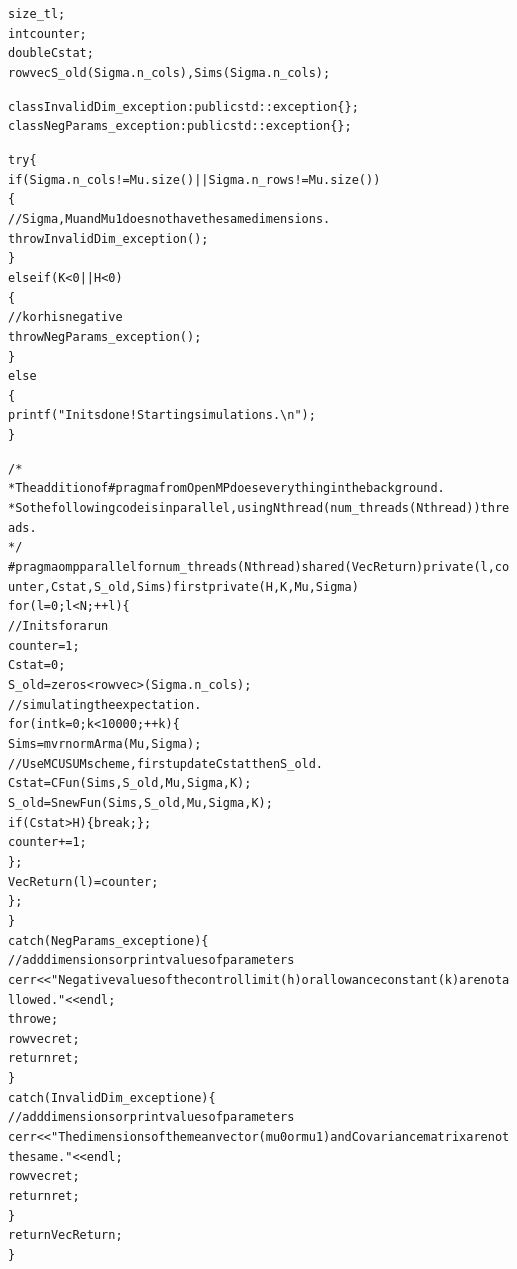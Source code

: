 \documentclass[a4paper,11pt,fleqn,twoside,notitlepage]{report}
\makeatletter
\newenvironment{kframe}{%
 \def\at@end@of@kframe{}%
 \ifinner\ifhmode%
  \def\at@end@of@kframe{\end{minipage}}%
  \begin{minipage}{\columnwidth}%
 \fi\fi%
 \def\FrameCommand##1{\hskip\@totalleftmargin \hskip-\fboxsep
 \colorbox{shadecolor}{##1}\hskip-\fboxsep
     \hskip-\linewidth \hskip-\@totalleftmargin \hskip\columnwidth}%
 \MakeFramed {\advance\hsize-\width
   \@totalleftmargin\z@ \linewidth\hsize
   \@setminipage}}%
 {\par\unskip\endMakeFramed%
 \at@end@of@kframe}
\newenvironment{knitrout}{}{} %
\makeatother
\begin{document}
\begin{knitrout}
\begin{kframe}
\begin{alltt}
  size_t l; 
  int counter;
  double Cstat;
  rowvec S_old(Sigma.n_cols), Sims(Sigma.n_cols);
  
  class InvalidDim_exception: public std::exception \{\};
  class NegParams_exception: public std::exception \{\};
                                                     
  try\{
    if (Sigma.n_cols != Mu.size() || Sigma.n_rows != Mu.size())
    \{
      // Sigma, Mu and Mu1 does not have the same dimensions.
      throw InvalidDim_exception();
    \}
    else if (K < 0 || H < 0)
    \{
      // k or h is negative
      throw NegParams_exception();
    \}
    else
    \{
      printf("Inits done! Starting simulations. \textbackslash{}n");
    \}
    
    /*
     * The addition of #pragma from OpenMP does everything in the background.
     * So the following code is in parallel, using Nthread (num_threads(Nthread)) threads.
     */
#pragma omp parallel for num_threads(Nthread) shared(VecReturn) private(l, counter, Cstat, S_old, Sims) firstprivate(H, K, Mu, Sigma)
      for (l = 0; l < N;++l)\{
        // Inits for a run
        counter = 1;
        Cstat = 0;
        S_old = zeros<rowvec>(Sigma.n_cols);
        // simulating the expectation.
        for (int k=0; k<10000; ++k)\{
          Sims = mvrnormArma(Mu, Sigma);
          // Use MCUSUM scheme, first update Cstat then S_old.
          Cstat = CFun(Sims, S_old, Mu, Sigma, K);
          S_old = SnewFun(Sims, S_old, Mu, Sigma, K);
          if (Cstat > H)\{break;\};
          counter += 1;
        \};
        VecReturn(l) = counter;  
      \};
  \}
  catch(NegParams_exception e)\{
    // add dimensions or print values of parameters
    cerr << "Negative values of the control limit (h) or allowance constant (k) are not allowed." << endl;
    throw e;
    rowvec ret;
    return ret;
  \}
  catch(InvalidDim_exception e)\{
    // add dimensions or print values of parameters
    cerr << "The dimensions of the mean vector (mu0 or mu1) and Covariance matrix are not the same." << endl;
    rowvec ret;
    return ret;
  \}
  return VecReturn;
\}

\end{alltt}
\end{kframe}
\end{knitrout}
\end{document}

